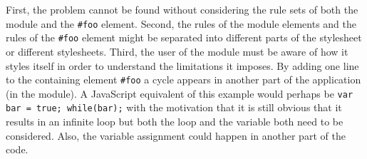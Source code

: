 \documentclass[a4paper,11pt]{kth-mag}
\newcommand{\code}[1]{\texttt{#1}}
\begin{document}
        First, the problem cannot be found without considering the rule sets of both the module and the \code{\#foo} \gls{element}.
        Second, the rules of the module \glspl{element} and the rules of the \code{\#foo} \gls{element} might be separated into different parts of the stylesheet or different stylesheets.
        Third, the user of the module must be aware of how it styles itself in order to understand the limitations it imposes.
        By adding one line to the containing element \code{\#foo} a cycle appears in another part of the application (in the module).
        A \gls{JavaScript} equivalent of this example would perhaps be \code{var bar = true; while(bar);} with the motivation that it is still obvious that it results in an infinite loop but both the loop and the variable both need to be considered.
        Also, the variable assignment could happen in another part of the code.
\end{document}
